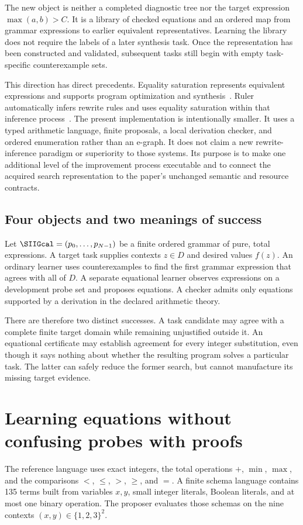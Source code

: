 The new object is neither a completed diagnostic tree nor the target expression $\max(a,b)>C$. It is a library of checked equations and an ordered map from grammar expressions to earlier equivalent representatives. Learning the library does not require the labels of a later synthesis task. Once the representation has been constructed and validated, subsequent tasks still begin with empty task-specific counterexample sets.

This direction has direct precedents. Equality saturation represents equivalent expressions and supports program optimization and synthesis~\cite{SII:egg}. Ruler automatically infers rewrite rules and uses equality saturation within that inference process~\cite{SII:ruler}. The present implementation is intentionally smaller. It uses a typed arithmetic language, finite proposals, a local derivation checker, and ordered enumeration rather than an e-graph. It does not claim a new rewrite-inference paradigm or superiority to those systems. Its purpose is to make one additional level of the improvement process executable and to connect the acquired search representation to the paper's unchanged semantic and resource contracts.

\subsection{Four objects and two meanings of success}
Let $\SIIGcal=(p_0,\ldots,p_{N-1})$ be a finite ordered grammar of pure, total expressions. A target task supplies contexts $z\in D$ and desired values $f(z)$. An ordinary learner uses counterexamples to find the first grammar expression that agrees with all of $D$. A separate equational learner observes expressions on a development probe set and proposes equations. A checker admits only equations supported by a derivation in the declared arithmetic theory.

There are therefore two distinct successes. A task candidate may agree with a complete finite target domain while remaining unjustified outside it. An equational certificate may establish agreement for every integer substitution, even though it says nothing about whether the resulting program solves a particular task. The latter can safely reduce the former search, but cannot manufacture its missing target evidence.

\section{Learning equations without confusing probes with proofs}\label{SII:sec:equation-learning}
The reference language uses exact integers, the total operations $+$, $\min$, $\max$, and the comparisons $<$, $\le$, $>$, $\ge$, and $=$. A finite schema language contains 135 terms built from variables $x,y$, small integer literals, Boolean literals, and at most one binary operation. The proposer evaluates those schemas on the nine contexts $(x,y)\in\{1,2,3\}^2$.

